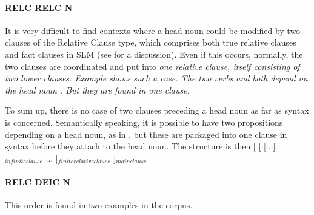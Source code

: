 \paragraph{RELC RELC N}
It is very difficult to find contexts where a head noun could be modified by two clauses of the Relative Clause type, which comprises both true relative clauses and fact clauses in SLM (see  for a discussion). Even if this occurs, normally, the two clauses are coordinated and put into \em one \em relative clause, itself consisting of two lower clauses. Example  shows such a case. The two verbs  and  both depend on the head noun . But they are found in \em one \em clause.


To sum up, there is no case of two clauses preceding a head noun as far as syntax is concerned. Semantically speaking, it is possible to have two propositions depending on a head noun, as in , but these are packaged into one clause in syntax before they attach to the head noun. The structure is then
[
		[
			[...]$_{infinite clause}$ ...
		]$_{finite relative clause}$
]$_{main clause}$


\paragraph{RELC DEIC N}
This order is found in two examples in the corpus.


